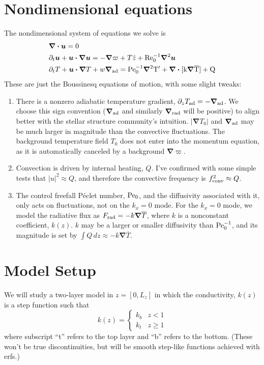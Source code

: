 \documentclass[12pt,preprint]{article}
\renewcommand{\vec}[1]{\boldsymbol{#1}}
\renewcommand{\dot}{\vec{\cdot}}
\newcommand{\grad}{\vec{\nabla}}
\begin{document}
\section{Nondimensional equations}
The nondimensional system of equations we solve is
\begin{align}
&\grad\dot\vec{u} = 0 \\
&\partial_t \vec{u} + \vec{u}\dot\grad\vec{u} = -\grad \varpi + T \hat{z} + \rm{Re}_0^{-1}\grad^2 \vec{u} \\
&\partial_t T + \vec{u}\dot\grad T + w \grad_{\rm{ad}} = \rm{Pe}_0^{-1}\grad^2 T' + \grad\dot[k \grad \overline{T}] + Q
\end{align}
These are just the Boussinesq equations of motion, with some slight tweaks:
\begin{enumerate}
\item There is a nonzero adiabatic temperature gradient, $\partial_z T_{\rm{ad}} = -\grad_{\rm{ad}}$.
We choose this sign convention ($\grad_{\rm{ad}}$ and similarly $\grad_{\rm{rad}}$ will be positive) to align better with the stellar structure community's intuition.
$|\grad T_0|$ and $\grad_{\rm{ad}}$ may be much larger in magnitude than the convective fluctuations.
The background temperature field $T_0$ does not enter into the momentum equation, as it is automatically canceled by a background $\grad \varpi$.
\item Convection is driven by internal heating, $Q$.
I've confirmed with some simple tests that $|u|^2 \approx Q$, and therefore the convective frequency is $f_{\rm{conv}}^2 \approx Q$.
\item The control freefall P\'{e}clet number, $\rm{Pe}_0$, and the diffusivity associated with it, only acts on fluctuations, not on the $k_x = 0$ mode.
For the $k_x = 0$ mode, we model the radiative flux as $F_{\rm{rad}} = -k \grad \overline{T}$, where $k$ is a nonconstant coefficient, $k(z)$.
$k$ may be a larger or smaller diffusivity than $\rm{Pe}_0^{-1}$, and its magnitude is set by $\int Q\, dz \approx -k \grad\overline{T}$.
\end{enumerate}


\section{Model Setup}
We will study a two-layer model in $z = [0, L_z]$ in which the conductivity, $k(z)$ is a step function such that
\begin{equation}
k(z) = \begin{cases}
k_b & z < 1 \\
k_t & z \geq 1
\end{cases}
\end{equation}
where subscript ``t'' refers to the top layer and ``b'' refers to the bottom.
(These won't be true discontinuities, but will be smooth step-like functions achieved with erfs.)
\end{document}
